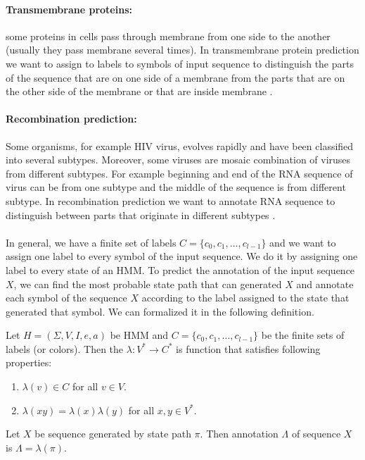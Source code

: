 \paragraph{Transmembrane proteins:} some proteins in cells pass through membrane
from one side to the another (usually they pass membrane several times).  In
transmembrane protein prediction we want to assign to labels to symbols of input
sequence to distinguish the parts of the sequence that are on one side of a
membrane from the parts that are on the other side of the membrane or that are
inside membrane \cite{Brown2010}.

\paragraph{Recombination prediction:} Some organisms, for example HIV virus,
evolves rapidly and have been classified into several subtypes.  Moreover,
some viruses are mosaic combination of viruses from different subtypes. For
example beginning and end of the RNA sequence of virus can be from one subtype and
the middle of the sequence is from different subtype. In recombination prediction
we want to annotate RNA sequence to distinguish between parts that originate in
different subtypes \cite{Nanasi2010,Truszkowski2011}.  

\paragraph{} In general,
we have a finite set of labels $C=\{c_0,c_1,\dots,c_{l-1}\}$ and we want to
assign one label to every symbol of the input sequence. We do it by assigning
one label to every state of an HMM.
To predict the annotation of the input sequence $X$, we can  find the
most probable state path that can generated $X$ and  annotate each symbol of
the sequence $X$ according to the label assigned to the state that generated that
symbol. We can formalized it in the following definition.


\begin{definition}\label{DEFINITION:ANNOTATION}
Let $H=(\Sigma,V,I,e,a)$ be HMM and $C=\{c_0,c_1,\dots,c_{l-1}\}$ be the finite
sets of labels (or colors). Then the  
$\lambda: V^*\to C^*$ is function that satisfies following properties:
\begin{enumerate}
\item $\lambda(v)\in C$ for all $v\in V$.
\item $\lambda(xy) = \lambda(x)\lambda(y)$ for all $x,y\in V^*$.
\end{enumerate}

Let $X$ be sequence generated by state path $\pi$. Then annotation
$\Lambda$ of sequence $X$ is $\Lambda = \lambda(\pi)$.
\end{definition}

